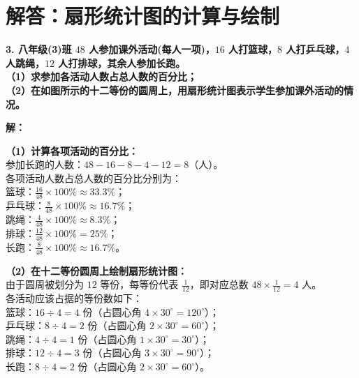 \newpage



\section{解答：扇形统计图的计算与绘制}

\vspace{0.6cm}

\textbf{3. 八年级(3)班 $48$ 人参加课外活动(每人一项)，$16$ 人打篮球，$8$ 人打乒乓球，$4$ 人跳绳，$12$ 人打排球，其余人参加长跑。}\\
\textbf{（1）求参加各活动人数占总人数的百分比；}\\
\textbf{（2）在如图所示的十二等份的圆周上，用扇形统计图表示学生参加课外活动的情况。}

\vspace{0.4cm}

\textbf{解：}

\textbf{（1）计算各项活动的百分比：} \\
参加长跑的人数：$48 - 16 - 8 - 4 - 12 = 8$（人）。\\
各项活动人数占总人数的百分比分别为：\\
篮球：$\frac{16}{48} \times 100\% \approx 33.3\%$；\\
乒乓球：$\frac{8}{48} \times 100\% \approx 16.7\%$；\\
跳绳：$\frac{4}{48} \times 100\% \approx 8.3\%$；\\
排球：$\frac{12}{48} \times 100\% = 25\%$；\\
长跑：$\frac{8}{48} \times 100\% \approx 16.7\%$。

\vspace{0.4cm}

\textbf{（2）在十二等份圆周上绘制扇形统计图：} \\
由于圆周被划分为 $12$ 等份，每等份代表 $\frac{1}{12}$，即对应总数 $48 \times \frac{1}{12} = 4$ 人。\\
各活动应该占据的等份数如下：\\
篮球：$16 \div 4 = 4$ 份（占圆心角 $4 \times 30^\circ = 120^\circ$）；\\
乒乓球：$8 \div 4 = 2$ 份（占圆心角 $2 \times 30^\circ = 60^\circ$）；\\
跳绳：$4 \div 4 = 1$ 份（占圆心角 $1 \times 30^\circ = 30^\circ$）；\\
排球：$12 \div 4 = 3$ 份（占圆心角 $3 \times 30^\circ = 90^\circ$）；\\
长跑：$8 \div 4 = 2$ 份（占圆心角 $2 \times 30^\circ = 60^\circ$）。

